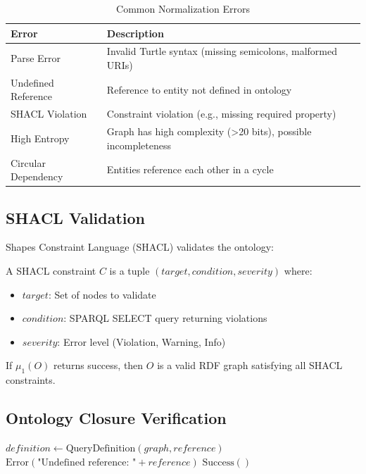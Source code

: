 \begin{table}[h]
\centering
\caption{Common Normalization Errors}
\begin{tabular}{lp{8cm}}
\toprule
\textbf{Error} & \textbf{Description} \\
\midrule
Parse Error & Invalid Turtle syntax (missing semicolons, malformed URIs) \\
Undefined Reference & Reference to entity not defined in ontology \\
SHACL Violation & Constraint violation (e.g., missing required property) \\
High Entropy & Graph has high complexity (>20 bits), possible incompleteness \\
Circular Dependency & Entities reference each other in a cycle \\
\bottomrule
\end{tabular}
\end{table}

\subsection{SHACL Validation}

Shapes Constraint Language (SHACL) validates the ontology:

\begin{definition}
    A SHACL constraint \(C\) is a tuple \((target, condition, severity)\) where:
    \begin{itemize}
        \item \(target\): Set of nodes to validate
        \item \(condition\): SPARQL SELECT query returning violations
        \item \(severity\): Error level (Violation, Warning, Info)
    \end{itemize}
\end{definition}

\begin{theorem}
    If \(\mu_1(O)\) returns success, then \(O\) is a valid RDF graph satisfying all SHACL constraints.
\end{theorem}

\subsection{Ontology Closure Verification}

\begin{algorithm}
\caption{Closure Verification}
\begin{algorithmic}[1]
        \State $definition \gets \text{QueryDefinition}(graph, reference)$
            \State \Return $\text{Error}(\text{"Undefined reference: "} + reference)$
        \EndIf
    \EndFor
    \State \Return $\text{Success}()$
\EndProcedure
\end{algorithmic}
\end{algorithm}

